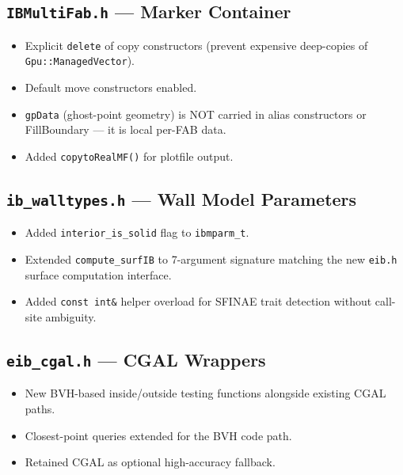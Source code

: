 \documentclass[11pt,a4paper]{article}
\begin{document}
\subsection{\texttt{IBMultiFab.h} --- Marker Container}

\begin{itemize}
  \item Explicit \texttt{delete} of copy constructors (prevent expensive
        deep-copies of \texttt{Gpu::ManagedVector}).
  \item Default move constructors enabled.
  \item \texttt{gpData} (ghost-point geometry) is NOT carried in alias
        constructors or FillBoundary --- it is local per-FAB data.
  \item Added \texttt{copytoRealMF()} for plotfile output.
\end{itemize}

\subsection{\texttt{ib\_walltypes.h} --- Wall Model Parameters}

\begin{itemize}
  \item Added \texttt{interior\_is\_solid} flag to \texttt{ibmparm\_t}.
  \item Extended \texttt{compute\_surfIB} to 7-argument signature
        matching the new \texttt{eib.h} surface computation interface.
  \item Added \texttt{const int\&} helper overload for SFINAE trait
        detection without call-site ambiguity.
\end{itemize}

\subsection{\texttt{eib\_cgal.h} --- CGAL Wrappers}

\begin{itemize}
  \item New BVH-based inside/outside testing functions alongside existing
        CGAL paths.
  \item Closest-point queries extended for the BVH code path.
  \item Retained CGAL as optional high-accuracy fallback.
\end{itemize}

\end{document}
